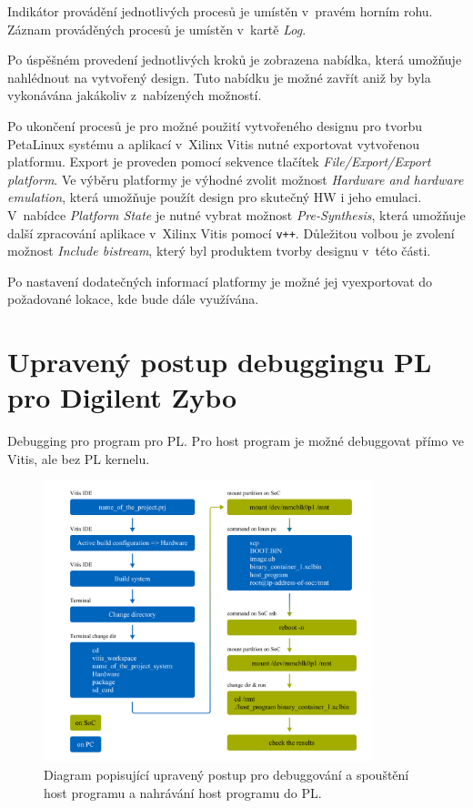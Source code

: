 \documentclass[a4paper, twoside, 11pt]{article}
\begin{document}
\begin{appendices}
		Indikátor provádění jednotlivých procesů je umístěn v~pravém horním rohu. Záznam prováděných procesů je umístěn v~kartě \textit{Log}.\par
		Po úspěšném provedení jednotlivých kroků je zobrazena nabídka, která umožňuje nahlédnout na vytvořený design. Tuto nabídku je možné zavřít aniž by byla vykonávána jakákoliv z~nabízených možností.\par
		Po ukončení procesů je pro možné použití vytvořeného designu pro tvorbu PetaLinux systému a aplikací v~Xilinx Vitis nutné exportovat vytvořenou platformu. Export je proveden pomocí sekvence tlačítek \textit{File/Export/Export platform}. Ve výběru platformy je výhodné zvolit možnost \textit{Hardware and hardware emulation}, která umožňuje použít design pro skutečný HW i jeho emulaci. V~nabídce \textit{Platform State} je nutné vybrat možnost \textit{Pre-Synthesis}, která umožňuje další zpracování aplikace v~Xilinx Vitis pomocí \texttt{v++}. Důležitou volbou je zvolení možnost \textit{Include bistream}, který byl produktem tvorby designu v~této části.\par
		Po nastavení dodatečných informací platformy je možné jej vyexportovat do požadované lokace, kde bude dále využívána.


	\section{Upravený postup debuggingu PL pro Digilent Zybo}
	Debugging pro program pro PL. Pro host program je možné debuggovat přímo ve Vitis, ale bez PL kernelu.
	\begin{figure}[htbp!]
		\centering
		\includegraphics[width=0.85\textwidth]{src/png/vitis-edited-debugging-flow.png}
		\caption{Diagram popisující upravený postup pro debuggování a spouštění host programu a nahrávání host programu do PL.}
		\label{fig:vitis-edited-debugging-flow}
	\end{figure}
	\end{appendices}
\end{document}
